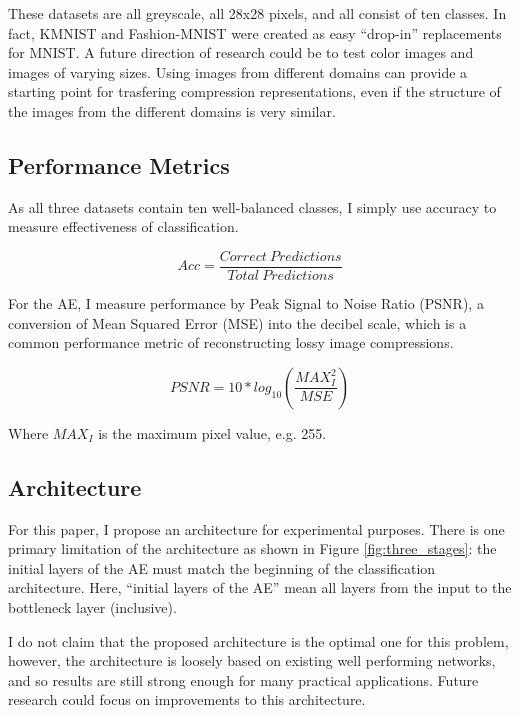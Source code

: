 \documentclass[twoside,11pt]{article}
\begin{document}
These datasets are all greyscale, all 28x28 pixels, and all consist of ten classes.
In fact, KMNIST and Fashion-MNIST were created as easy ``drop-in'' replacements for MNIST.
A future direction of research could be to test color images and images of varying sizes.
Using images from different domains can provide a starting point for trasfering 
compression representations, even if the structure of the images from the different 
domains is very similar.

\subsection{Performance Metrics}

As all three datasets contain ten well-balanced classes, I simply use accuracy to measure
effectiveness of classification. 

\begin{equation}
Acc = \frac{Correct\ Predictions}{Total\ Predictions}
\end{equation}

For the AE, I measure performance by Peak Signal to Noise Ratio (PSNR), 
a conversion of Mean Squared Error (MSE) into the decibel scale, which is a common
performance metric of reconstructing lossy image compressions.

\begin{equation}
PSNR = 10*log_{10}\left(\frac{MAX^2_I}{MSE}\right)
\end{equation}

Where $MAX_I$ is the maximum pixel value, e.g. 255.


\subsection{Architecture}

For this paper, I propose an architecture for experimental purposes.
There is one primary limitation of the architecture as shown in Figure \ref{fig:three_stages}:
the initial layers of the AE must match the beginning of the classification architecture.
Here, ``initial layers of the AE'' mean all layers from the input to the bottleneck layer (inclusive).

I do not claim that the proposed architecture is the optimal one for this problem,
however, the architecture is loosely based on existing well performing networks, and so 
results are still strong enough for many practical applications.
Future research could focus on improvements to this architecture.
\end{document}
